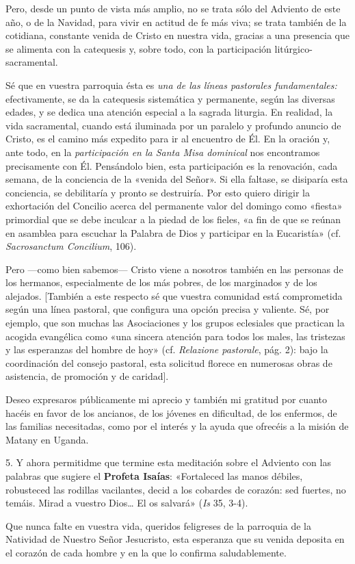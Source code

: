 \begin{body}
					Pero, desde un punto de vista más amplio, no se trata sólo del Adviento de este año, o de la Navidad, para vivir en actitud de fe más viva; se trata también de la cotidiana, constante venida de Cristo en nuestra vida, gracias a una presencia que se alimenta con la catequesis y, sobre todo, con la participación litúrgico-sacramental.
					
					Sé que en vuestra parroquia ésta es \emph{una de las líneas pastorales fundamentales:} efectivamente, se da la catequesis sistemática y permanente, según las diversas edades, y se dedica una atención especial a la sagrada liturgia. En realidad, la vida sacramental, cuando está iluminada por un paralelo y profundo anuncio de Cristo, es el camino más expedito para ir al encuentro de Él. En la oración y, ante todo, en la \emph{participación en la Santa Misa dominical} nos encontramos precisamente con Él. Pensándolo bien, esta participación es la renovación, cada semana, de la conciencia de la «venida del Señor». Si ella faltase, se disiparía esta conciencia, se debilitaría y pronto se destruiría. Por esto quiero dirigir la exhortación del Concilio acerca del permanente valor del domingo como «fiesta» primordial que se debe inculcar a la piedad de los fieles, «a fin de que se reúnan en asamblea para escuchar la Palabra de Dios y participar en la Eucaristía» (cf. \emph{Sacrosanctum Concilium}, 106). 
					
					Pero ---como bien sabemos--- Cristo viene a nosotros también en las personas de los hermanos, especialmente de los más pobres, de los marginados y de los alejados. {[}También a este respecto sé que vuestra comunidad está comprometida según una línea pastoral, que configura una opción precisa y valiente. Sé, por ejemplo, que son muchas las Asociaciones y los grupos eclesiales que practican la acogida evangélica como «una sincera atención para todos los males, las tristezas y las esperanzas del hombre de hoy» (cf. \emph{Relazione pastorale}, pág. 2): bajo la coordinación del consejo pastoral, esta solicitud florece en numerosas obras de asistencia, de promoción y de caridad{]}.
					
					Deseo expresaros públicamente mi aprecio y también mi gratitud por cuanto hacéis en favor de los ancianos, de los jóvenes en dificultad, de los enfermos, de las familias necesitadas, como por el interés y la ayuda que ofrecéis a la misión de Matany en Uganda. 
					
					5. Y ahora permitidme que termine esta meditación sobre el Adviento con las palabras que sugiere el \textbf{Profeta Isaías}: «Fortaleced las manos débiles, robusteced las rodillas vacilantes, decid a los cobardes de corazón: sed fuertes, no temáis. Mirad a vuestro Dios\ldots{} El os salvará» (\emph{Is} 35, 3-4). 
					
					Que nunca falte en vuestra vida, queridos feligreses de la parroquia de la Natividad de Nuestro Señor Jesucristo, esta esperanza que su venida deposita en el corazón de cada hombre y en la que lo confirma saludablemente.
				\end{body}


